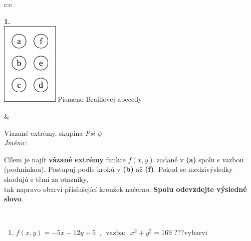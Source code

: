 \documentclass[10pt]{report}
\begin{document}
\begin{tabular}{c:c}
\begin{minipage}[c][104.5mm][t]{0.5\linewidth}
\begin{center}
\begin{minipage}{0.79\linewidth}
\begin{center}
\begin{varwidth}{\linewidth}
\begin{enumerate}
\end{enumerate}
\end{varwidth}
\end{center}
\end{minipage}
\begin{minipage}{0.20\linewidth}
\begin{center}
{\Huge\bfseries 1.} \\[2mm]
\includegraphics[height=40mm]{../images/braille.png}
{\small Písmeno Braillovej abecedy}
\end{center}
\end{minipage}
\end{center}
\end{minipage}
&
\begin{minipage}[c][104.5mm][t]{0.5\linewidth}
\begin{center}
\vspace{7mm}
{\huge Viazané extrémy, skupina \textit{Psi $\psi$} -}\\[5mm]
\textit{Jméno:}\phantom{xxxxxxxxxxxxxxxxxxxxxxxxxxxxxxxxxxxxxxxxxxxxxxxxxxxxxxxxxxxxxxxxx}\\[5mm]
\begin{minipage}{0.95\linewidth}
\begin{center}
Cílem je najít \textbf{vázané extrémy} funkce $f(x,y)$ zadané v \textbf{(a)} spolu s vazbou (podmínkou). Postupuj podle krokú v \textbf{(b)} až \textbf{(f)}. Pokud se medzivýsledky shodujú s těmi za otazníky,\\tak napravo obarvi příslušející kroužek načerno. \textbf{Spolu odevzdejte výsledné slovo}.
\end{center}
\end{minipage}
\\[1mm]
\begin{minipage}{0.79\linewidth}
\begin{center}
\begin{varwidth}{\linewidth}
\begin{enumerate}
\normalsize
\item $f(x,y)=-5x-12y+5 \enspace , \enspace \mathrm{vazba:} \enspace x^2+y^2=169$\quad \dotfill\; ???\;\dotfill \quad vybarvi

\end{enumerate}
\end{varwidth}
\end{center}
\end{minipage}
\end{center}
\end{minipage}
\end{tabular}
\end{document}
